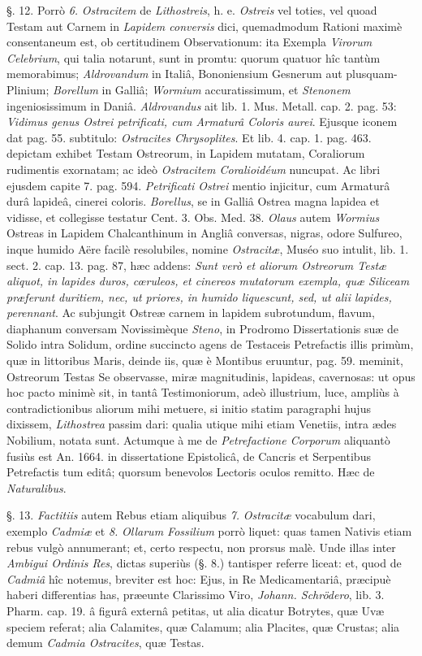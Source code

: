 \documentclass[a4paper, 11pt, oneside, polutonikogreek, german]{article}
\begin{document}
§. 12. Porrò \emph{6.} \emph{Ostracitem} de \emph{Lithostreis}, h. e. \emph{Ostreis} vel toties, vel quoad Testam aut Carnem in \emph{Lapidem conversis} dici, quemadmodum Rationi maximè consentaneum est, ob certitudinem Observationum: ita Exempla \emph{Virorum Celebrium}, qui talia notarunt, sunt in promtu: quorum quatuor hîc tantùm memorabimus; \emph{Aldrovandum} in Italiâ, Bononiensium Gesnerum aut plusquam-Plinium; \emph{Borellum} in Galliâ; \emph{Wormium} accuratissimum, et \emph{Stenonem} ingeniosissimum in Daniâ. \emph{Aldrovandus} ait lib. 1. Mus. Metall. cap. 2. pag. 53: \emph{Vidimus genus Ostrei petrificati, cum Armaturâ Coloris aurei}. Ejusque iconem dat pag. 55. subtitulo: \emph{Ostracites Chrysoplites}. Et lib. 4. cap. 1. pag. 463. depictam exhibet Testam Ostreorum, in Lapidem mutatam, Coraliorum rudimentis exornatam; ac ideò \emph{Ostracitem Coralioidéum} nuncupat. Ac libri ejusdem capite 7. pag. 594. \emph{Petrificati Ostrei} mentio injicitur, cum Armaturâ durâ lapideâ, cinerei coloris. \emph{Borellus}, se in Galliâ Ostrea magna lapidea et vidisse, et collegisse testatur Cent. 3. Obs. Med. 38. \emph{Olaus} autem \emph{Wormius} Ostreas in Lapidem Chalcanthinum in Angliâ conversas, nigras, odore Sulfureo, inque humido Aëre facilè resolubiles, nomine \emph{Ostracitæ}, Muséo suo intulit, lib. 1. sect. 2. cap. 13. pag. 87, hæc addens: \emph{Sunt verò et aliorum Ostreorum Testæ aliquot, in lapides duros, cœruleos, et cinereos mutatorum exempla, quæ Siliceam præferunt duritiem, nec, ut priores, in humido liquescunt, sed, ut alii lapides, perennant}. Ac subjungit Ostreæ carnem in lapidem subrotundum, flavum, diaphanum conversam Novissimèque \emph{Steno}, in Prodromo Dissertationis suæ de Solido intra Solidum, ordine succincto agens de Testaceis Petrefactis illis primùm, quæ in littoribus Maris, deinde iis, quæ è Montibus eruuntur, pag. 59. meminit, Ostreorum Testas Se observasse, miræ magnitudinis, lapideas, cavernosas: ut opus hoc pacto minimè sit, in tantâ Testimoniorum, adeò illustrium, luce, ampliùs à contradictionibus aliorum mihi metuere, si initio statim paragraphi hujus dixissem, \emph{Lithostrea} passim dari: qualia utique mihi etiam Venetiis, intra ædes Nobilium, notata sunt. Actumque à me de \emph{Petrefactione Corporum} aliquantò fusiùs est An. 1664. in dissertatione Epistolicâ, de Cancris et Serpentibus Petrefactis tum editâ; quorsum benevolos Lectoris oculos remitto. Hæc de \emph{Naturalibus}.

§. 13. \emph{Factitiis} autem Rebus etiam aliquibus \emph{7.} \emph{Ostracitæ} vocabulum dari, exemplo \emph{Cadmiæ} et \emph{8.} \emph{Ollarum Fossilium} porrò liquet: quas tamen Nativis etiam rebus vulgò annumerant; et, certo respectu, non prorsus malè. Unde illas inter \emph{Ambigui Ordinis Res}, dictas superiùs (§. 8.) tantisper referre liceat: et, quod de \emph{Cadmiâ} hîc notemus, breviter est hoc: Ejus, in Re Medicamentariâ, præcipuè haberi differentias has, præeunte Clarissimo Viro, \emph{Johann. Schrödero}, lib. 3. Pharm. cap. 19. â figurâ externâ petitas, ut alia dicatur Botrytes, quæ Uvæ speciem referat; alia Calamites, quæ Calamum; alia Placites, quæ Crustas; alia demum \emph{Cadmia Ostracites}, quæ Testas.
\end{document}
